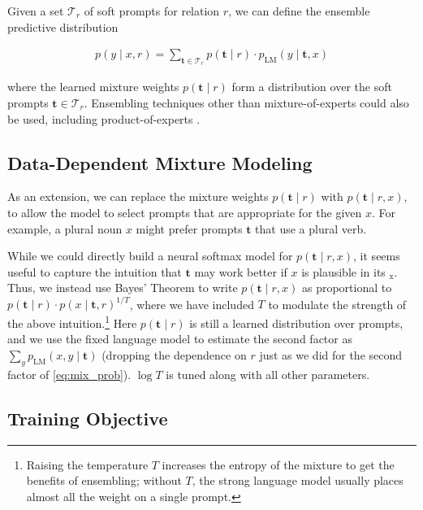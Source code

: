 Given a set $\mathcal{T}_r$ of soft prompts for relation $r$, we can define the ensemble predictive distribution

\begin{align}
    p(y \mid x, r) = \sum_{\mathbf{t} \in \mathcal{T}_r} p(\mathbf{t} \mid r) \cdot p_\mathrm{LM}(y \mid \mathbf{t}, x) \label{eq:mix_prob}
\end{align}

where the learned mixture weights $p(\mathbf{t} \mid r)$ form a distribution over the soft prompts $\mathbf{t} \in \mathcal{T}_r$.  
Ensembling techniques other than mixture-of-experts could also be used, including product-of-experts \cite{jiangHowCanWe2020}.

\subsection{Data-Dependent Mixture Modeling}\label{sec:data-dep-weights}

As an extension, we can replace the mixture weights $p(\mathbf{t} \mid r)$ with $p(\mathbf{t} \mid r, x)$, to allow the model to select prompts that are appropriate for the given $x$.  For example, a plural noun $x$ might prefer prompts $\mathbf{t}$ that use a plural verb.

While we could directly build a neural softmax model for $p(\mathbf{t} \mid r, x)$, it seems useful to capture the intuition that $\mathbf{t}$ may work better if $x$ is plausible in its \underline{}$\!_\mathrm{x}$.  Thus, we instead use Bayes' Theorem to write $p(\mathbf{t} \mid r, x)$ as proportional to $p(\mathbf{t} \mid r) \cdot p(x \mid \mathbf{t}, r)^{1/T}$, where we have included $T$ to modulate the strength of the above intuition.\footnote{Raising the temperature $T$ increases the entropy of the mixture to get the benefits of ensembling; without $T$, the strong language model usually places almost all the weight on a single prompt.}  Here $p(\mathbf{t} \mid r)$ is still a learned distribution over prompts, and we use the fixed language model to estimate the second factor as $\sum_{y} p_\mathrm{LM}(x, y \mid \mathbf{t})$ (dropping the dependence on $r$ just as we did for the second factor of \eqref{eq:mix_prob}).  $\log T$ is tuned along with all other parameters.

\subsection{Training Objective}
\label{sec:trainobj}

